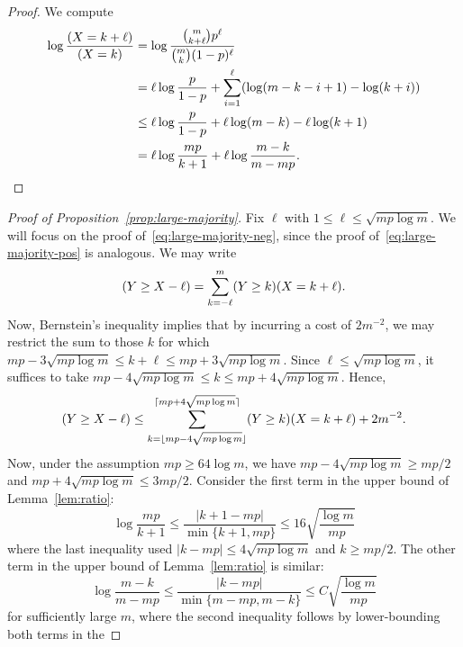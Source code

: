 \documentclass[EJP,final]{ejpecp}
\newcommand{\1}[1]{\mathbbm{1}_{\{#1\}}}
\let\Pr\relax
\DeclareMathOperator{\Pr}{Pr}
\begin{document}
\begin{proof}
 We compute
 \begin{align*}
  \log \frac {\Pr(X = k + \ell)}{\Pr(X = k)}
  &= \log \frac {\binom{m}{k+\ell} p^\ell} {\binom mk (1-p)^\ell} \\
  &= \ell \log \frac{p}{1-p} + \sum_{i=1}^\ell (\log(m-k-i+1) - \log(k+i)) \\
  &\le \ell \log \frac{p}{1-p} + \ell \log(m-k) - \ell \log(k+1) \\
  &= \ell \log \frac{mp}{k+1} + \ell \log \frac{m-k}{m-mp}.
  \qedhere
 \end{align*}
\end{proof}

\begin{proof}[Proof of Proposition~\ref{prop:large-majority}]
 Fix $\ell$ with $1 \le \ell \le \sqrt{mp \log m}$.
 We will focus on the proof of~\eqref{eq:large-majority-neg},
 since the proof of~\eqref{eq:large-majority-pos} is analogous.
 We may write
 \[
  \Pr(Y \ge X - \ell)
  = \sum_{k=-\ell}^m \Pr(Y \ge k) \Pr(X = k + \ell).
 \]
 Now, Bernstein's inequality implies that by incurring
 a cost of $2m^{-2}$, we may restrict the sum to those $k$ for which
 $mp - 3\sqrt{mp \log m} \le k + \ell \le mp + 3\sqrt{mp \log m}$.
 Since $\ell \le \sqrt{mp \log m}$, it suffices to take
 $mp - 4\sqrt{mp \log m} \le k \le mp + 4\sqrt{mp \log m}$. Hence,
 \begin{equation}\label{eq:constant-majority-1}
  \Pr(Y \ge X - \ell)
  \le \sum_{k=\lfloor mp - 4\sqrt{mp \log m}\rfloor}
	  ^{\lceil mp + 4\sqrt{mp \log m}\rceil}
	  \Pr(Y \ge k) \Pr(X = k + \ell) + 2m^{-2}.
 \end{equation}
 Now, under the assumption $mp \ge 64 \log m$, we have
 $mp - 4\sqrt{mp \log m} \ge mp/2$ and
 $mp + 4\sqrt{mp \log m} \le 3mp/2$.
 Consider the first term in the upper bound of Lemma~\ref{lem:ratio}:
 \begin{equation}\label{eq:ratio-term-1}
  \log \frac{mp}{k+1}
  \le \frac{|k+1-mp|}{\min\{k+1,mp\}}
  \le 16 \sqrt{\frac{\log m}{mp}}
 \end{equation}
 where the last inequality used $|k - mp| \le 4 \sqrt{mp \log m}$ and
 $k \ge mp/2$. The other term in the upper bound of Lemma~\ref{lem:ratio} is similar:
 \begin{equation}\label{eq:ratio-term-2}
     \log \frac{m-k}{m-mp} \le \frac{|k-mp|}{\min\{m-mp, m-k\}}
     \le C \sqrt{\frac{\log m}{mp}}
 \end{equation}
 for sufficiently large $m$,
 where the second inequality follows by lower-bounding both terms in the

\end{proof}
\end{document}
